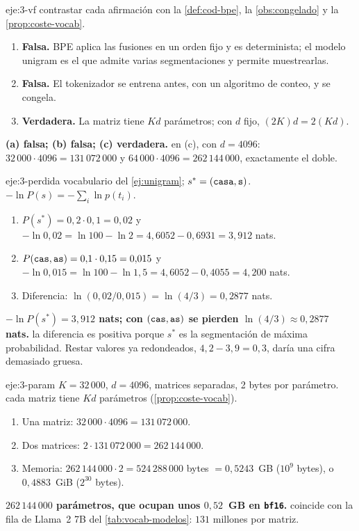 \begin{solucion}{eje:3-vf}
\planteamiento contrastar cada afirmación con la \cref{def:cod-bpe}, la \cref{obs:congelado} y la \cref{prop:coste-vocab}.
\pasos
\begin{enumerate}[label=(\alph*)]
  \item \textbf{Falsa.} BPE aplica las fusiones en un orden fijo y es determinista; el modelo unigram es el que admite varias segmentaciones y permite muestrearlas.
  \item \textbf{Falsa.} El tokenizador se entrena antes, con un algoritmo de conteo, y se congela.
  \item \textbf{Verdadera.} La matriz tiene $Kd$ parámetros; con $d$ fijo, $(2K)d=2(Kd)$.
\end{enumerate}
\resultado \textbf{(a) falsa; (b) falsa; (c) verdadera.}
\comprobacion en (c), con $d=4096$: $32\,000\cdot 4096=131\,072\,000$ y $64\,000\cdot 4096=262\,144\,000$, exactamente el doble.
\end{solucion}

\begin{solucion}{eje:3-perdida}
\datos vocabulario del \cref{ej:unigram}; $s^{*}=(\texttt{casa},\texttt{s})$.
\planteamiento $-\ln P(s)=-\sum_i\ln p(t_i)$.
\pasos
\begin{enumerate}[label=\arabic*.]
  \item $P(s^{*})=0{,}2\cdot 0{,}1=0{,}02$ y $-\ln 0{,}02=\ln 100-\ln 2=4{,}6052-0{,}6931=3{,}912$ nats.
  \item $P(\texttt{cas},\texttt{as})=0{,}1\cdot 0{,}15=0{,}015$ y $-\ln 0{,}015=\ln 100-\ln 1{,}5=4{,}6052-0{,}4055=4{,}200$ nats.
  \item Diferencia: $\ln(0{,}02/0{,}015)=\ln(4/3)=0{,}2877$ nats.
\end{enumerate}
\resultado \textbf{$-\ln P(s^{*})=3{,}912$ nats; con $(\texttt{cas},\texttt{as})$ se pierden $\ln(4/3)\approx 0{,}2877$ nats.}
\comprobacion la diferencia es positiva porque $s^{*}$ es la segmentación de máxima probabilidad. Restar valores ya redondeados, $4{,}2-3{,}9=0{,}3$, daría una cifra demasiado gruesa.
\end{solucion}

\begin{solucion}{eje:3-param}
\datos $K=32\,000$, $d=4096$, matrices separadas, 2 bytes por parámetro.
\planteamiento cada matriz tiene $Kd$ parámetros (\cref{prop:coste-vocab}).
\pasos
\begin{enumerate}[label=\arabic*.]
  \item Una matriz: $32\,000\cdot 4096=131\,072\,000$.
  \item Dos matrices: $2\cdot 131\,072\,000=262\,144\,000$.
  \item Memoria: $262\,144\,000\cdot 2=524\,288\,000$ bytes $=0{,}5243$~GB ($10^{9}$ bytes), o $0{,}4883$~GiB ($2^{30}$ bytes).
\end{enumerate}
\resultado \textbf{$262\,144\,000$ parámetros, que ocupan unos $0{,}52$~GB en \texttt{bf16}.}
\comprobacion coincide con la fila de Llama~2 7B del \cref{tab:vocab-modelos}: $131$ millones por matriz.
\end{solucion}

